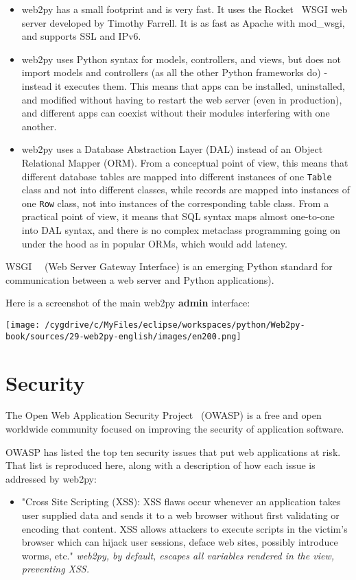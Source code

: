 \documentclass[justified,sixbynine,notoc]{tufte-book}
\def\ft{\small\tt}
\def\inxx#1{\index{#1}}
\begin{document}
\begin{fullwidth}
\begin{itemize}
\item web2py has a small footprint and is very fast. It uses the Rocket~\cite{rocket}  WSGI web server developed by Timothy Farrell. It is as fast as Apache with mod\_wsgi, and supports SSL and IPv6.

\item web2py uses Python syntax for models, controllers, and views, but does not import models and controllers (as all the other Python frameworks do) - instead it executes them. This means that apps can be installed, uninstalled, and modified without having to restart the web server (even in production), and different apps can coexist without their modules interfering with one another.

\item web2py uses a Database Abstraction Layer (DAL) instead of an Object Relational Mapper (ORM). From a conceptual point of view, this means that different database tables are mapped into different instances of one {\ft Table} class and not into different classes, while records are mapped into instances of one {\ft Row} class, not into instances of the corresponding table class. From a practical point of view, it means that SQL syntax maps almost one-to-one into DAL syntax, and there is no complex metaclass programming going on under the hood as in popular ORMs, which would add latency.
\end{itemize}

WSGI~\cite{wsgi-w}~\cite{wsgi-o} (Web Server Gateway Interface) is an emerging Python standard for communication between a web server and Python applications).

Here is a screenshot of the main web2py {\bf admin} interface:


\goodbreak\begin{center}\texttt{[image: /cygdrive/c/MyFiles/eclipse/workspaces/python/Web2py-book/sources/29-web2py-english/images/en200.png]}\end{center}


\goodbreak\section{Security}

\inxx{security}
The Open Web Application Security Project~\cite{owasp}  (OWASP) is a free and open worldwide community focused
on improving the security of application software.

OWASP has listed the top ten security issues that put web applications at risk.
That list is reproduced here, along with a description of how each issue is addressed by web2py:
\begin{itemize}
\item \inxx{cross site scripting}  "Cross Site Scripting (XSS): XSS flaws occur whenever an application takes user supplied data and sends it to a web browser without first validating or encoding that content. XSS allows attackers to execute scripts in the victim's browser which can hijack user sessions, deface web sites, possibly introduce worms, etc." {\it web2py, by default, escapes all variables rendered in the view, preventing XSS.}


\end{itemize}
\end{fullwidth}
\end{document}
